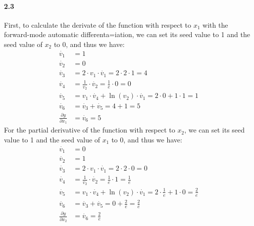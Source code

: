 \documentclass[11pt]{article}
\begin{document}
\paragraph{2.3}
First, to calculate the derivate of the function with respect to $x_1$ with the forward-mode automatic differenta=iation, we can set its seed value to 1 and the seed value of $x_2$ to 0, and thus we have:
\begin{equation}
  \begin{split}
    \dot{v_1} &= 1 \\
    \dot{v_2} &= 0 \\
    \dot{v_3} &= 2\cdot v_1 \cdot \dot{v_1} = 2\cdot 2 \cdot 1 = 4 \\
    \dot{v_4} &= \frac{1}{v_2} \cdot \dot{v_2} = \frac{1}{e}\cdot 0 = 0 \\
    \dot{v_5} &= v_1\cdot \dot{v_4} + \ln(v_2)\cdot \dot{v_1} = 2\cdot 0 + 1\cdot 1 = 1 \\
    \dot{v_6} &= \dot{v_3} + \dot{v_5} = 4 + 1 = 5 \\
    \frac{\partial y}{\partial x_1} &= \dot{v_6} = 5
  \end{split}
\end{equation}
For the partial derivative of the function with respect to $x_2$, we can set its seed value to 1 and the seed value of $x_1$ to 0, and thus we have:
\begin{equation}
  \begin{split}
    \dot{v_1} &= 0 \\
    \dot{v_2} &= 1 \\
    \dot{v_3} &= 2\cdot v_1 \cdot \dot{v_1} = 2\cdot 2 \cdot 0 = 0 \\
    \dot{v_4} &= \frac{1}{v_2} \cdot \dot{v_2} = \frac{1}{e}\cdot 1 = \frac{1}{e} \\
    \dot{v_5} &= v_1\cdot \dot{v_4} + \ln(v_2)\cdot \dot{v_1} = 2\cdot\frac{1}{e} + 1\cdot 0 = \frac{2}{e} \\
    \dot{v_6} &= \dot{v_3} + \dot{v_5} = 0 + \frac{2}{e} = \frac{2}{e} \\
    \frac{\partial y}{\partial x_2} &= \dot{v_6} = \frac{2}{e}
  \end{split}
\end{equation}
\end{document}
